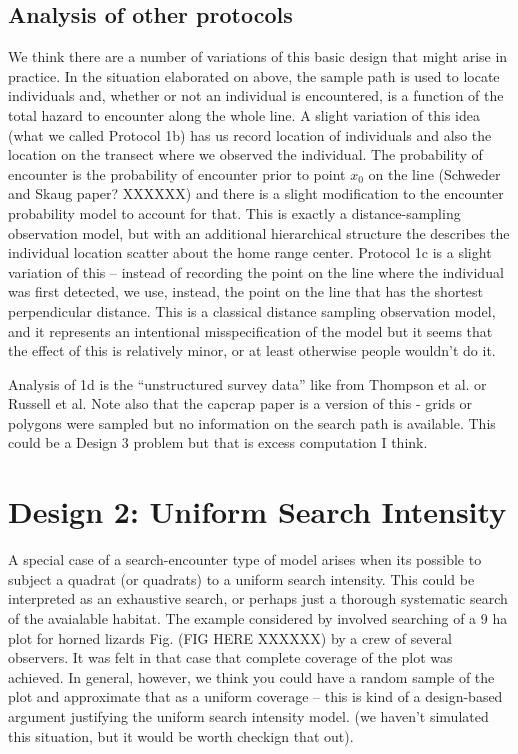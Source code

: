 \subsection{Analysis of other protocols}


We think there are a number of variations of this basic design that
might arise in practice. 
In the situation elaborated on above, 
the sample path is used to locate individuals and, whether or not an
individual is encountered, is a function of the total hazard to
encounter along the whole line.
A slight variation of this idea (what we called Protocol 1b)
has us record location of individuals and also the location on the 
transect where we observed the individual. 
The probability of encounter is the probability of encounter prior to
point $x_{0}$ on the line (Schweder and Skaug paper? XXXXXX) and there
is a slight modification to the encounter probability model to account
for that. This is exactly a 
 distance-sampling observation model, but with an 
additional hierarchical structure the describes the individual
location scatter about the home range center.
Protocol 1c is a slight variation of this -- instead of recording the
point on the line where the individual was first detected, we use,
instead, the point on the line that has the shortest perpendicular
distance. This is a classical distance sampling observation model, and
it  represents an intentional misspecification of the model
but it seems that the effect of this is relatively minor, or at least
otherwise people wouldn't do it. 

Analysis of 1d is the ``unstructured survey data'' like
from Thompson et al. or Russell et al.  Note also that the capcrap
paper is a version of this - grids or polygons were sampled but no
information on the search path is available. This could be a Design 3
problem but that is excess computation I think.








\section{Design 2: Uniform Search Intensity}

A special case of a search-encounter type of model arises when its
possible to subject a quadrat (or quadrats) to a uniform search
intensity. This could be interpreted as an exhaustive search, or
perhaps just a thorough systematic search of the avaialable habitat. 
The example considered by \citet{royle_young:2008} involved searching
of a 9 ha plot for horned lizards Fig. 
(FIG HERE XXXXXX) by a crew of
several observers. It was felt in that case that complete coverage of
the plot was achieved. In general, however, we think you could have
a random sample of the plot and approximate that as a uniform coverage
-- this is kind of a design-based argument justifying the uniform
search intensity model. (we haven't simulated this situation, but it
would be worth checkign that out).

